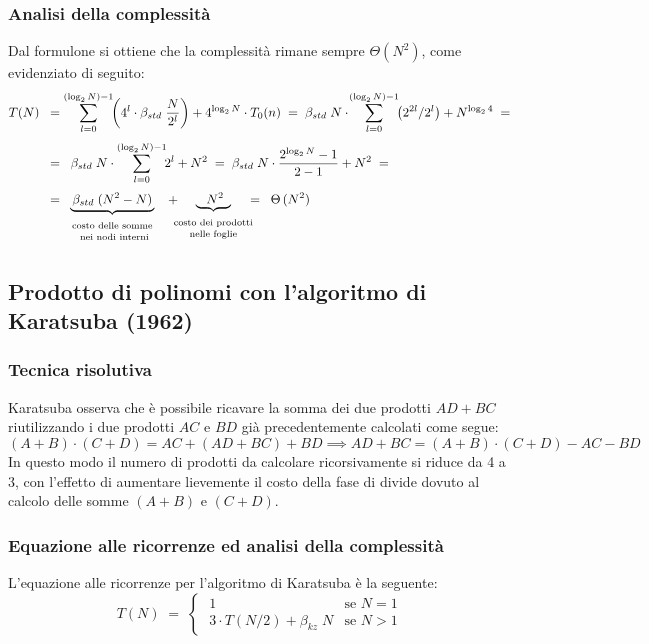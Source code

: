 \subsubsection*{Analisi della complessità}
Dal formulone si ottiene che la complessità rimane sempre \(\Theta(N^2)\), come evidenziato di seguito:
\begin{align*}
	T(N) \;\; &= \sum_{l=0}^{(\log_2 N) - 1} \!\! \left( 4^l \cdot \beta_{std} \; \frac{N}{2^l} \right) + 4^{\log_2 N} \cdot T_0(n) \; = \; \beta_{std} \; N \cdot \! \sum_{l=0}^{(\log_2 N) - 1} \!\! \left( 2^{2l}/2^l \right) + N^{\log_2 4} \; = \\[3pt]
	&= \;\; \beta_{std} \; N \cdot \sum_{l=0}^{(\log_2 N) - 1} \!\! 2^l + N^2 \; = \; \beta_{std} \; N \cdot \frac{2^{\log_2 N} - 1}{2 - 1} + N^2 \; = \\[3pt]
	&= \, \underbrace{\, \beta_{std} \; (N^2 - N) \,}_{\begin{array}{c} \text{\scriptsize costo delle somme} \\[-3pt] \text{ \scriptsize nei nodi interni} \end{array}}
	\;\; + \!\!\!\!\!\! \underbrace{\;\;\;N^2\;\;}_{\begin{array}{c} \text{\scriptsize costo dei prodotti} \\[-3pt] \text{\scriptsize nelle foglie} \end{array}} \!\!\!\!\!\! = \;\; \Theta \, (N^2)
\end{align*}

\subsection{Prodotto di polinomi con l'algoritmo di Karatsuba (1962)}
\subsubsection*{Tecnica risolutiva}
Karatsuba osserva che è possibile ricavare la somma dei due prodotti \(AD + BC\) riutilizzando i due prodotti \(AC\) e \(BD\)
già precedentemente calcolati come segue:
\[(A + B) \cdot (C + D) = AC + (AD + BC) + BD \implies AD + BC = (A + B) \cdot (C + D) - AC - BD\]
In questo modo il numero di prodotti da calcolare ricorsivamente si riduce da 4 a 3, con l'effetto di aumentare lievemente
il costo della fase di divide dovuto al calcolo delle somme \((A + B)\) e \((C + D)\).

\subsubsection*{Equazione alle ricorrenze ed analisi della complessità}
L'equazione alle ricorrenze per l'algoritmo di Karatsuba è la seguente:
\[T(N) \; = \; \begin{cases}
	\; 1 & \text{se } N = 1 \\[3pt]
	\; 3 \cdot T(N/2) + \beta_{kz} \; N & \text{se } N > 1
\end{cases}\]


